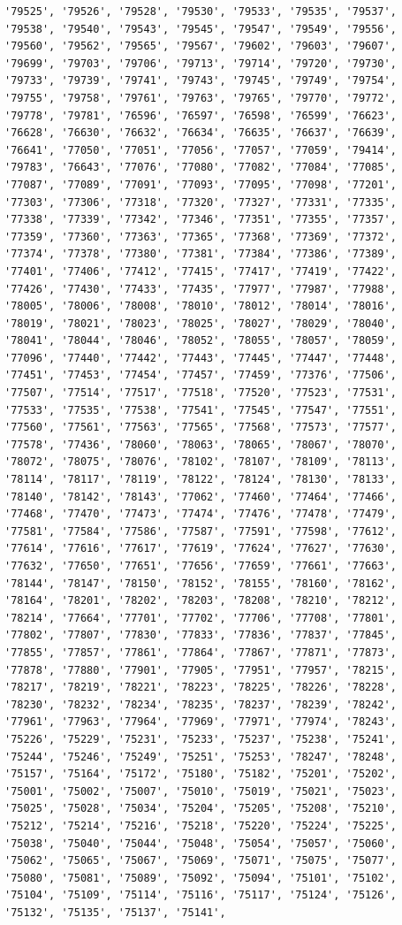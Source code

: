 \documentclass[
  letterpaper,
  DIV=11,
  numbers=noendperiod]{scrartcl}
\begin{document}
\begin{verbatim}
'79525', '79526', '79528', '79530', '79533', '79535', '79537', '79538', '79540', '79543', '79545', '79547', '79549', '79556', '79560', '79562', '79565', '79567', '79602', '79603', '79607', '79699', '79703', '79706', '79713', '79714', '79720', '79730', '79733', '79739', '79741', '79743', '79745', '79749', '79754', '79755', '79758', '79761', '79763', '79765', '79770', '79772', '79778', '79781', '76596', '76597', '76598', '76599', '76623', '76628', '76630', '76632', '76634', '76635', '76637', '76639', '76641', '77050', '77051', '77056', '77057', '77059', '79414', '79783', '76643', '77076', '77080', '77082', '77084', '77085', '77087', '77089', '77091', '77093', '77095', '77098', '77201', '77303', '77306', '77318', '77320', '77327', '77331', '77335', '77338', '77339', '77342', '77346', '77351', '77355', '77357', '77359', '77360', '77363', '77365', '77368', '77369', '77372', '77374', '77378', '77380', '77381', '77384', '77386', '77389', '77401', '77406', '77412', '77415', '77417', '77419', '77422', '77426', '77430', '77433', '77435', '77977', '77987', '77988', '78005', '78006', '78008', '78010', '78012', '78014', '78016', '78019', '78021', '78023', '78025', '78027', '78029', '78040', '78041', '78044', '78046', '78052', '78055', '78057', '78059', '77096', '77440', '77442', '77443', '77445', '77447', '77448', '77451', '77453', '77454', '77457', '77459', '77376', '77506', '77507', '77514', '77517', '77518', '77520', '77523', '77531', '77533', '77535', '77538', '77541', '77545', '77547', '77551', '77560', '77561', '77563', '77565', '77568', '77573', '77577', '77578', '77436', '78060', '78063', '78065', '78067', '78070', '78072', '78075', '78076', '78102', '78107', '78109', '78113', '78114', '78117', '78119', '78122', '78124', '78130', '78133', '78140', '78142', '78143', '77062', '77460', '77464', '77466', '77468', '77470', '77473', '77474', '77476', '77478', '77479', '77581', '77584', '77586', '77587', '77591', '77598', '77612', '77614', '77616', '77617', '77619', '77624', '77627', '77630', '77632', '77650', '77651', '77656', '77659', '77661', '77663', '78144', '78147', '78150', '78152', '78155', '78160', '78162', '78164', '78201', '78202', '78203', '78208', '78210', '78212', '78214', '77664', '77701', '77702', '77706', '77708', '77801', '77802', '77807', '77830', '77833', '77836', '77837', '77845', '77855', '77857', '77861', '77864', '77867', '77871', '77873', '77878', '77880', '77901', '77905', '77951', '77957', '78215', '78217', '78219', '78221', '78223', '78225', '78226', '78228', '78230', '78232', '78234', '78235', '78237', '78239', '78242', '77961', '77963', '77964', '77969', '77971', '77974', '78243', '75226', '75229', '75231', '75233', '75237', '75238', '75241', '75244', '75246', '75249', '75251', '75253', '78247', '78248', '75157', '75164', '75172', '75180', '75182', '75201', '75202', '75001', '75002', '75007', '75010', '75019', '75021', '75023', '75025', '75028', '75034', '75204', '75205', '75208', '75210', '75212', '75214', '75216', '75218', '75220', '75224', '75225', '75038', '75040', '75044', '75048', '75054', '75057', '75060', '75062', '75065', '75067', '75069', '75071', '75075', '75077', '75080', '75081', '75089', '75092', '75094', '75101', '75102', '75104', '75109', '75114', '75116', '75117', '75124', '75126', '75132', '75135', '75137', '75141', 
\end{verbatim}
\end{document}
